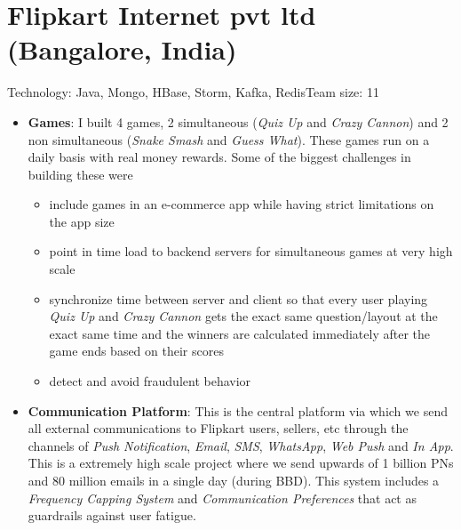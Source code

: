 \documentclass[11pt,a4paper,sans]{moderncv} %
\begin{document}
\section{Flipkart Internet pvt ltd (Bangalore, India)}
         {Technology: Java, Mongo, HBase, Storm, Kafka, Redis}{Team size: 11}
         {\begin{itemize}
            \item \textbf{Games}: I built 4 games, 2 simultaneous (\textit{Quiz Up} and \textit{Crazy Cannon}) and 2 non simultaneous (\textit{Snake Smash} and \textit{Guess What}). These games run on a daily basis with real money rewards. Some of the biggest challenges in building these were
              \begin{itemize}
                \item include games in an e-commerce app while having strict limitations on the app size
                \item point in time load to backend servers for simultaneous games at very high scale
                \item synchronize time between server and client so that every user playing \textit{Quiz Up} and \textit{Crazy Cannon} gets the exact same question/layout at the exact same time and the winners are calculated immediately after the game ends based on their scores
                \item detect and avoid fraudulent behavior
              \end{itemize}
            \item \textbf{Communication Platform}: This is the central platform via which we send all external communications to Flipkart users, sellers, etc through the channels of \textit{Push Notification}, \textit{Email},  \textit{SMS}, \textit{WhatsApp}, \textit{Web Push} and \textit{In App}. This is a extremely high scale project where we send upwards of 1 billion PNs and 80 million emails in a single day (during BBD). This system includes a \textit{Frequency Capping System} and \textit{Communication Preferences} that act as guardrails against user fatigue.

\end{itemize}}
\end{document}
